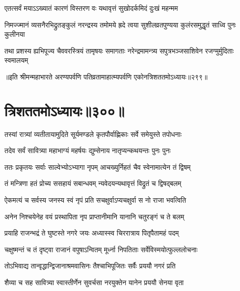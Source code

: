 \twolineshloka
{एतत्सर्वं मयाऽऽख्यातं कारणं विस्तरण वः}
{यथावृत्तं सुखोदर्कमिदं दुःखं महन्मम}




\twolineshloka
{निमज्ज्मानं व्यसनैरभिद्रुतङ्कुलं नरन्द्रस्य तमोमये ह्रदे}
{त्वया सुशीलव्रतपुण्यया कुलंरसमुद्धृतं साध्वि पुनः कुलीनया}




\twolineshloka
{तथा प्रशस्य ह्यभिपूज्य चैववरस्त्रियं तामृषयः समागताः}
{नरेन्द्रमामन्त्र्य सपुत्रभञ्जसाशिवेन रजग्मुर्मुदिताः स्वमालयम्}


॥इति श्रीमन्महाभारते अरण्यपर्वणि पतिव्रतामाहात्म्यपर्वणि एकोनत्रिशततमोऽध्यायः॥२९९॥


\chapter{त्रिशततमोऽध्यायः॥३००॥}


\twolineshloka
{तस्यां रात्र्यां व्यतीतायामुदिते सूर्यमण्डले}
{कृतपौर्वाह्णिकाः सर्वे समेयुस्ते तपोधनाः}


\twolineshloka
{तदेव सर्वं सावित्र्या महाभाग्यं महर्षयः}
{द्युम्सेनाय नातृप्यन्कथयन्तः पुनः पुनः}


\twolineshloka
{ततः प्रकृतयः सर्वाः साल्वेभ्योऽभ्यागा नृपम्}
{आचख्युर्निहतं चैव स्वेनामात्येन तं द्विषम्}


\twolineshloka
{तं मन्त्रिणा हतं प्रोच्य ससहायं सबान्धवम्}
{न्यवेदयन्यथावृत्तं विद्रुतं च द्विषद्बलम्}


\twolineshloka
{ऐकमत्यं च सर्वस्य जनस्य स्वं नृपं प्रति}
{सचक्षुर्वाऽप्यचक्षुर्वा स नो राजा भवत्विति}


\twolineshloka
{अनेन निश्चयेनेह वयं प्रस्थापिता नृप}
{प्राप्तानीमानि यानानि चतुरङ्गं च ते बलम्}


\twolineshloka
{प्रयाहि राजन्भद्रं ते घुष्टस्ते नगरे जयः}
{अध्यास्स्व चिररात्राय पितृपैतामहं पदम्}




\twolineshloka
{चक्षुष्मन्तं च तं दृष्ट्वा राजानं वपुषाऽन्वितम्}
{मूर्ध्ना निपतिताः सर्वेविस्मयोत्फुल्ललोचनाः}


\twolineshloka
{तोऽभिवाद्य तान्वृद्धान्द्विजानाश्रमवासिनः}
{तैश्चाभिपूजितः सर्वैः प्रययौ नगरं प्रति}


\twolineshloka
{शैव्या च सह सावित्र्या स्वास्तीर्णेन सुवर्चसा}
{नरयुक्तेन यानेन प्रययौ सेनया वृता}


